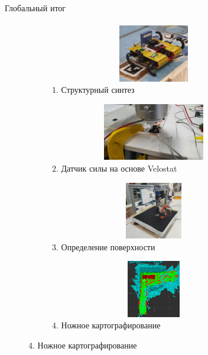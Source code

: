 \documentclass[aspectratio=169,xcolor=table]{beamer}
\newcommand{\fbckg}[1]{\usebackgroundtemplate{\texttt{[image: \#1]}}}%
\begin{document}
\begin{frame}[t]{Глобальный итог}
    \framesubtitle{}
    \large
    \vspace{-0.5cm}
    \begin{figure}[H]
        \begin{subfigure}[t]{0.49\textwidth}
            \centering\includegraphics[height=2.5cm,width=1\textwidth,keepaspectratio]{strirus_3.JPG}
            \caption*{1. Структурный синтез}
        \end{subfigure}
        \begin{subfigure}[t]{0.49\textwidth}
            \centering\includegraphics[height=2.5cm,width=1\textwidth,keepaspectratio]{velostat_sensor_look.JPG}
            \caption*{2. Датчик силы на основе Velostat}
        \end{subfigure}
    
        \begin{subfigure}[t]{0.49\textwidth}
            \centering\includegraphics[height=2.5cm,width=1\textwidth,keepaspectratio]{s_shape_leg/s_leg_setup.JPG}
            \caption*{3. Определение поверхности}
        \end{subfigure}
        \begin{subfigure}[t]{0.49\textwidth}
            \centering\includegraphics[height=2.5cm,width=1\textwidth,keepaspectratio]{conv_concave.png}
            \caption*{4. Ножное картографирование}
        \end{subfigure}
    \end{figure}
\end{frame}

\end{document}
